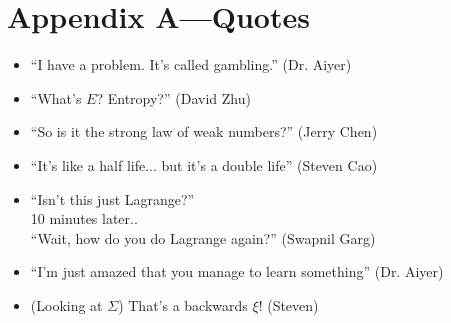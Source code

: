 \documentclass[11pt]{article}
\theoremstyle{definition}
\begin{document}
\newpage
\section*{Appendix A---Quotes}
\begin{itemize}
\item ``I have a problem. It's called gambling.'' (Dr. Aiyer)
\item ``What's $E$? Entropy?'' (David Zhu)
\item ``So is it the strong law of weak numbers?'' (Jerry Chen)
\item ``It's like a half life... but it's a double life'' (Steven Cao)
\item ``Isn't this just Lagrange?''  \\ 10 minutes later.. \\ ``Wait, how do you do Lagrange again?'' (Swapnil Garg)
\item ``I'm just amazed that you manage to learn something'' (Dr. Aiyer)
\item (Looking at $\Sigma$) That's a backwards $\xi$! (Steven)
\end{itemize}
\end{document}

